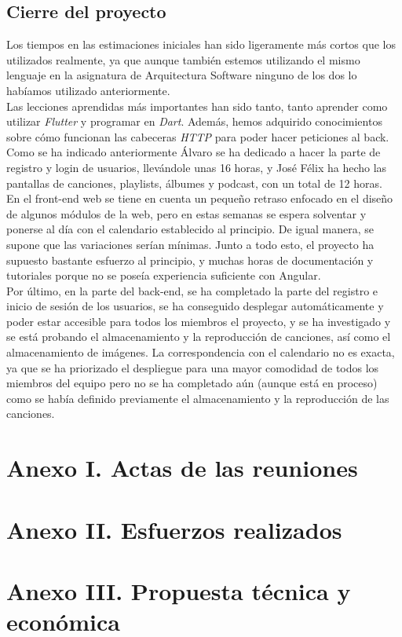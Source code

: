 \documentclass{article}
\begin{document}
\subsection{Cierre del proyecto}
Los tiempos en las estimaciones iniciales han sido ligeramente más cortos que los utilizados realmente, ya que aunque también estemos utilizando el mismo lenguaje en la asignatura de Arquitectura Software ninguno de los dos lo habíamos utilizado anteriormente.\\
\hfill \break
Las lecciones aprendidas más importantes han sido tanto, tanto aprender como utilizar \textit{Flutter} y programar en \textit{Dart}. Además, hemos adquirido conocimientos sobre cómo funcionan las cabeceras \textit{HTTP} para poder hacer peticiones al back.\\
Como se ha indicado anteriormente Álvaro se ha dedicado a hacer la parte de registro y login de usuarios, llevándole unas 16 horas, y José Félix ha hecho las pantallas de canciones, playlists, álbumes y podcast, con un total de 12 horas.\\
\newpage
En el front-end web se tiene en cuenta un pequeño retraso enfocado en el diseño de algunos módulos de la web, pero en estas semanas se espera solventar y ponerse al día con el calendario establecido al principio. De igual manera, se supone que las variaciones serían mínimas. Junto a todo esto, el proyecto ha supuesto bastante esfuerzo al principio, y muchas horas de documentación y tutoriales porque no se poseía experiencia suficiente con Angular.\\
\hfill \break
Por último, en la parte del back-end, se ha completado la parte del registro e inicio de sesión de los usuarios, se ha conseguido desplegar automáticamente y poder estar accesible para todos los miembros el proyecto, y se ha investigado y se está probando el almacenamiento y la reproducción de canciones, así como el almacenamiento de imágenes. La correspondencia con el calendario no es exacta, ya que se ha priorizado el despliegue para una mayor comodidad de todos los miembros del equipo pero no se ha completado aún (aunque está en proceso) como se había definido previamente el almacenamiento y la reproducción de las canciones.
\newpage
\section*{Anexo I. Actas de las reuniones}
\section*{Anexo II. Esfuerzos realizados}
\section*{Anexo III. Propuesta técnica y económica}
\end{document}
